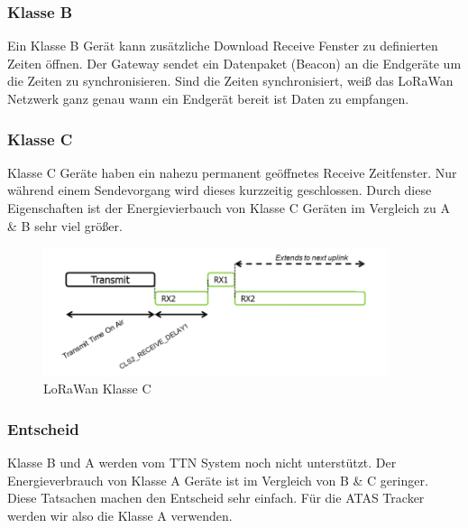 \documentclass[11pt,english,german]{report}
\theoremstyle{definition}
\begin{document}
\subsubsection{Klasse B}
Ein Klasse B Gerät kann zusätzliche Download Receive Fenster zu definierten Zeiten öffnen. Der Gateway sendet ein Datenpaket (Beacon) an die Endgeräte um die Zeiten zu synchronisieren. Sind die Zeiten synchronisiert, weiß das LoRaWan Netzwerk ganz genau wann ein Endgerät bereit ist Daten zu empfangen. 

\newpage
\subsubsection{Klasse C}
Klasse C Geräte haben ein nahezu permanent geöffnetes Receive Zeitfenster. Nur während einem Sendevorgang wird dieses kurzzeitig geschlossen. Durch diese Eigenschaften ist der Energievierbauch von Klasse C Geräten im Vergleich zu A \& B sehr viel größer.

\begin{figure}[H]
	\centering
	\includegraphics[width=0.9\textwidth]{img/lora/lorawan_class_c.png}
	\caption[LoRaWan Klasse C]
	{LoRaWan Klasse C}
\end{figure}

\subsubsection{Entscheid}
Klasse B und A werden vom TTN System noch nicht unterstützt. Der Energieverbrauch von Klasse A Geräte ist im Vergleich von B \& C geringer. Diese Tatsachen machen den Entscheid sehr einfach. Für die ATAS Tracker werden wir also die Klasse A verwenden. 

\newpage
\end{document}
